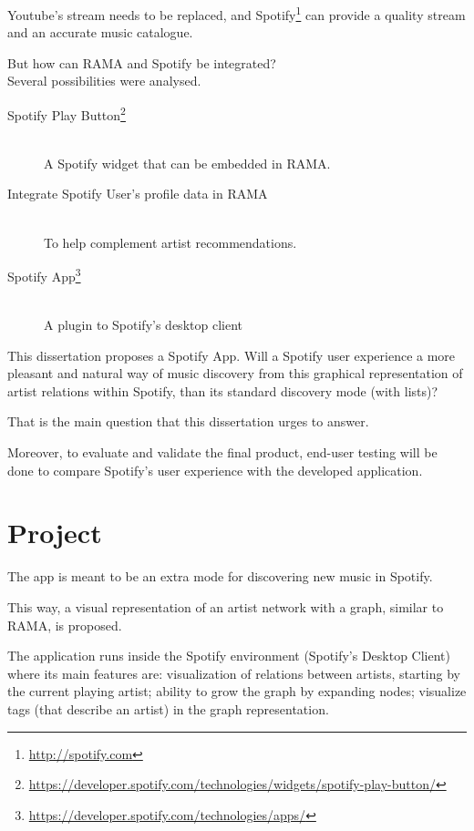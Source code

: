 Youtube's stream needs to be replaced, and Spotify\footnote{\url{http://spotify.com}} can provide a quality stream and an accurate music catalogue.

But how can RAMA and Spotify be integrated? \\

Several possibilities were analysed.

\begin{description}
  \item[Spotify Play Button\footnote{\url{https://developer.spotify.com/technologies/widgets/spotify-play-button/}}] \hfill \\
    A Spotify widget that can be embedded in RAMA. 
  \item[Integrate Spotify User's profile data in RAMA] \hfill \\
    To help complement artist recommendations.
  \item[Spotify App\footnote{\url{https://developer.spotify.com/technologies/apps/}}] \hfill \\
    A plugin to Spotify's desktop client
\end{description}


This dissertation proposes a Spotify App.
Will a Spotify user experience a more pleasant and natural way of music discovery from this graphical representation of artist relations within Spotify, than its standard discovery mode (with lists)?

That is the main question that this dissertation urges to answer.

Moreover, to evaluate and validate the final product, end-user testing will be done to compare Spotify's user experience with the developed application. 


\section{Project} \label{sec:proj}

The app is meant to be an extra mode for discovering new music in Spotify.

This way, a visual representation of an artist network with a graph, similar to RAMA, is proposed.

The application runs inside the Spotify environment (Spotify's Desktop Client) where its main features are: visualization of relations between artists, starting by the current playing artist; ability to grow the graph by expanding nodes; visualize tags (that describe an artist) in the graph representation.


